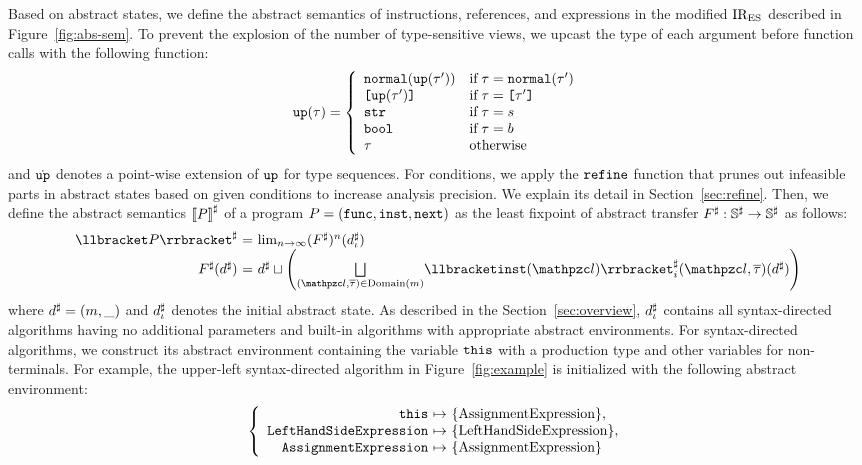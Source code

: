 Based on abstract states, we define the abstract semantics of instructions,
references, and expressions in the modified ${\text{IR}_\text{ES}}$ described in
Figure~\ref{fig:abs-sem}.  To prevent the explosion of the number of type-sensitive
views, we upcast the type of each argument before function calls with the
following function:
\[
  \texttt{up}(\tau) = \left\{
    \begin{array}{ll}
      \texttt{normal}(\texttt{up}(\tau')) & \text{if} \; \tau = \texttt{normal}(\tau')\\
      \texttt{[} \texttt{up}(\tau') \texttt{]} & \text{if} \; \tau = \texttt{[} \tau' \texttt{]}\\
      \texttt{str} & \text{if} \; \tau = s\\
      \texttt{bool} & \text{if} \; \tau = b\\
      \tau & \text{otherwise}\\
    \end{array}
  \right.
\]
and $\dot{\texttt{up}}$ denotes a point-wise extension of $\texttt{up}$ for type sequences.
For conditions, we apply the $\texttt{refine}$ function that prunes out infeasible parts
in abstract states based on given conditions to increase analysis precision.  We
explain its detail in Section~\ref{sec:refine}.  Then, we define the abstract
semantics ${\llbracket{P}\rrbracket}^\sharp$ of a program $P = (\mathtt{func}, \mathtt{inst}, \mathtt{next})$
as the least fixpoint of abstract transfer ${F}^\sharp: {\mathbb{S}}^\sharp \rightarrow {\mathbb{S}}^\sharp$
as follows:
\[
  \begin{array}{r@{~}c@{~}l}
    \asem{\prog} &=& \lim_{n \rightarrow \infty}(\atransfer)^n(\iaelem)\\
    \atransfer(\aelem) &=& \aelem \join \left(
      \underset{(\lab, \tys) \in \domain{\rmap}}{\bigjoin}
      \asemi{\getinst(\lab)}(\lab, \tys)(\aelem)
    \right)\\
  \end{array}
\]
where ${d}^\sharp = (m, \_)$ and ${d_\iota^\sharp}$ denotes the initial abstract state.
As described in the Section~\ref{sec:overview}, ${d_\iota^\sharp}$ contains all
syntax-directed algorithms having no additional parameters and built-in
algorithms with appropriate abstract environments.  For syntax-directed
algorithms, we construct its abstract environment containing the variable
$\texttt{this}$ with a production type and other variables for non-terminals.  For
example, the upper-left syntax-directed algorithm in Figure~\ref{fig:example} is
initialized with the following abstract environment:
\[
  \left\{
    \begin{array}{r@{~}c@{~}l}
      \this &\mapsto& \{ \text{AssignmentExpression} \},\\
      \mcode{LeftHandSideExpression} &\mapsto& \{ \text{LeftHandSideExpression} \},\\
      \mcode{AssignmentExpression} &\mapsto& \{ \text{AssignmentExpression} \}
    \end{array}
  \right.
\]
